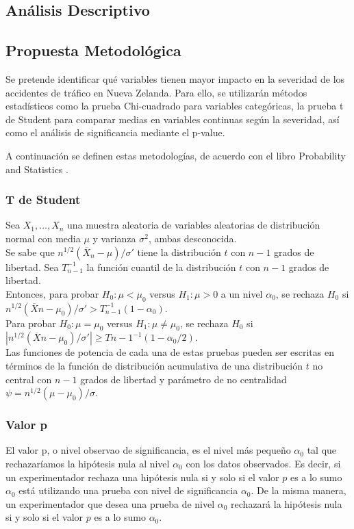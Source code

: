 \documentclass{book}
\begin{document}
\subsection{Análisis Descriptivo}

\subsection{Propuesta Metodológica}
Se pretende identificar qué variables tienen mayor impacto en la severidad de los accidentes de tráfico en Nueva Zelanda. Para ello, se utilizarán métodos estadísticos como la prueba Chi-cuadrado para variables categóricas, la prueba t de Student para comparar medias en variables continuas según la severidad, así como el análisis de significancia mediante el p-value. 

A continuación se definen estas metodologías, de acuerdo con el libro Probability and Statistics \cite{degroot2012probability}.

\subsubsection{T de Student}
Sea $X_1, \ldots, X_n$ una muestra aleatoria de variables aleatorias de distribución normal con media $\mu$ y varianza $\sigma^2$, ambas desconocida. \\
Se sabe que $n^{1/2}(\overline{X}_n - \mu)/\sigma'$ tiene la distribución $t$ con $n - 1$ grados de libertad. Sea $T_{n-1}^{-1}$ la función cuantil de la distribución $t$ con $n - 1$ grados de libertad.\\
Entonces, para probar $H_0: \mu < \mu_0$ versus $H_1: \mu > 0$ a un nivel $\alpha_0$, se rechaza $H_0$ si $n^{1/2}(\overline{X}n - \mu_0)/\sigma' > T_{n-1}^{-1}(1 - \alpha_0)$. \\
Para probar $H_0: \mu = \mu_0$ versus $H_1: \mu \neq \mu_0$, se rechaza $H_0$ si $|n^{1/2}(\overline{X}n - \mu_0)/\sigma'| \geq T{n-1}^{-1}(1 - \alpha_0/2)$. \\
Las funciones de potencia de cada una de estas pruebas pueden ser escritas en términos de la función de distribución acumulativa de una distribución $t$ no central con $n - 1$ grados de libertad y parámetro de no centralidad $\psi = n^{1/2}(\mu - \mu_0)/\sigma$.

\subsubsection{Valor p}
El valor p, o nivel observao de significancia, es el nivel más pequeño $\alpha_0$ tal que rechazaríamos la hipótesis nula al nivel $\alpha_0$ con los datos observados. Es decir, si un experimentador rechaza una hipótesis nula si y solo si el valor $p$ es a lo sumo $\alpha_0$ está utilizando una prueba con nivel de significancia $\alpha_0$. De la misma manera, un experimentador que desea una prueba de nivel $\alpha_0$ rechazará la hipótesis nula si y solo si el valor $p$ es a lo sumo $\alpha_0$.
\end{document}
